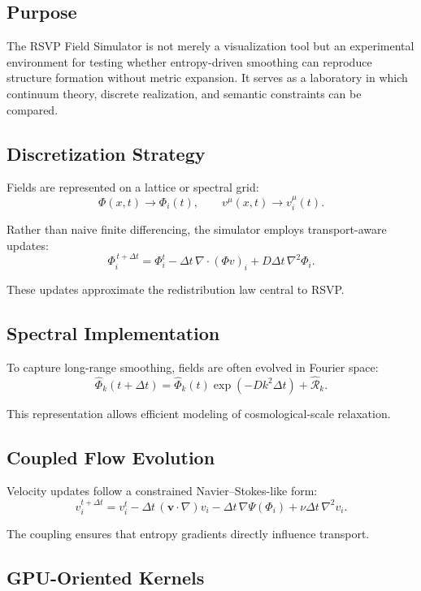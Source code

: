 \documentclass[12pt]{article}
\begin{document}
\subsection{Purpose}

The RSVP Field Simulator is not merely a visualization tool but an experimental environment for testing whether entropy-driven smoothing can reproduce structure formation without metric expansion. It serves as a laboratory in which continuum theory, discrete realization, and semantic constraints can be compared.

\subsection{Discretization Strategy}

Fields are represented on a lattice or spectral grid:
\[
\Phi(x,t)\rightarrow \Phi_{i}(t), \qquad v^\mu(x,t)\rightarrow v^\mu_i(t).
\]

Rather than naive finite differencing, the simulator employs transport-aware updates:
\[
\Phi_i^{\,t+\Delta t}=\Phi_i^t-\Delta t\,\nabla\cdot(\Phi v)_i + D\Delta t\,\nabla^2\Phi_i.
\]

These updates approximate the redistribution law central to RSVP.

\subsection{Spectral Implementation}

To capture long-range smoothing, fields are often evolved in Fourier space:
\[
\hat{\Phi}_k(t+\Delta t)=\hat{\Phi}_k(t)\exp(-Dk^2\Delta t)+\widehat{\mathcal{R}}_k.
\]

This representation allows efficient modeling of cosmological-scale relaxation.

\subsection{Coupled Flow Evolution}

Velocity updates follow a constrained Navier--Stokes-like form:
\[
v_i^{t+\Delta t}=v_i^t-\Delta t\,(\bm{v}\cdot\nabla)v_i -\Delta t\,\nabla\Psi(\Phi_i)+\nu\Delta t\,\nabla^2v_i.
\]

The coupling ensures that entropy gradients directly influence transport.

\subsection{GPU-Oriented Kernels}
\end{document}
